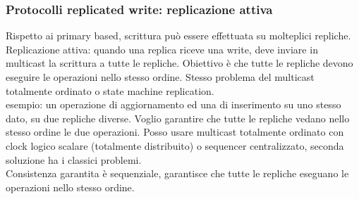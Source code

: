 \documentclass{article}
\begin{document}
\subsubsection{Protocolli replicated write: replicazione attiva}
Rispetto ai primary based, scrittura può essere effettuata su molteplici repliche.\\ Replicazione attiva: quando una replica riceve una write, deve inviare in multicast la scrittura a tutte le repliche. Obiettivo è che tutte le repliche devono eseguire le operazioni nello stesso ordine. Stesso problema del multicast totalmente ordinato o state machine replication.\\ esempio: un operazione di aggiornamento ed una di inserimento su uno stesso dato, su due repliche diverse. Voglio garantire che tutte le repliche vedano nello stesso ordine le due operazioni. Posso usare multicast totalmente ordinato con clock logico scalare (totalmente distribuito) o sequencer centralizzato, seconda soluzione ha i classici problemi.\\ Consistenza garantita è sequenziale, garantisce che tutte le repliche eseguano le operazioni nello stesso ordine.
\end{document}
